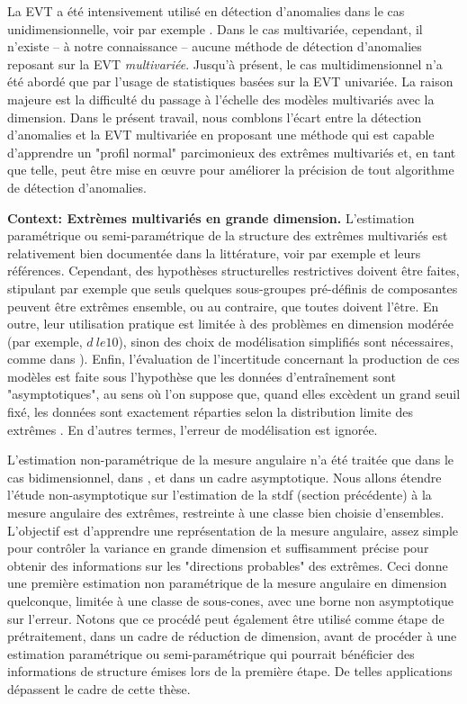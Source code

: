 La EVT a été intensivement utilisé en détection d'anomalies dans le cas unidimensionnelle, voir par exemple \cite{Roberts99, Roberts2000, Clifton2011, Clifton2008, Lee2008}. Dans le cas multivariée, cependant, il n'existe -- à notre connaissance -- aucune méthode de détection d'anomalies reposant sur la EVT \textit {multivariée}. Jusqu'à présent, le cas multidimensionnel n'a été abordé que par l'usage de statistiques basées sur la EVT univariée. La raison majeure est la difficulté du passage à l'échelle des modèles multivariés avec la dimension. Dans le présent travail, nous comblons l'écart entre la détection d'anomalies et la EVT multivariée en proposant une méthode qui est capable d'apprendre un "profil normal" parcimonieux des extrêmes multivariés et, en tant que telle, peut être mise en œuvre pour améliorer la précision de tout algorithme de détection d'anomalies.


\textbf{Context: Extrèmes multivariés en grande dimension.}
L'estimation paramétrique ou semi-paramétrique de la structure des extrêmes multivariés est relativement bien documentée dans la littérature, voir par exemple
\cite{coles1991modeling,fougeres2009models,cooley2010pairwise,sabourinNaveau2012} 
et leurs références. Cependant, des hypothèses structurelles restrictives doivent être faites, stipulant par exemple que seuls quelques sous-groupes pré-définis de composantes peuvent être extrêmes ensemble, ou au contraire, que toutes doivent l'être. En outre, leur utilisation pratique est limitée à des problèmes en dimension modérée (par exemple, $ d \ le 10 $), sinon des choix de modélisation simplifiés sont nécessaires, comme dans \cite {stephenson2009high}). Enfin, l'évaluation de l'incertitude concernant la production de ces modèles est faite sous l'hypothèse que les données d'entraînement sont "asymptotiques", au sens où l'on suppose que, quand elles excèdent un grand seuil fixé, les données sont exactement réparties selon la distribution limite des extrêmes . En d'autres termes, l'erreur de modélisation est ignorée.


L'estimation non-paramétrique de la mesure angulaire n'a été traitée que dans le cas bidimensionnel, dans \cite{Einmahl2001, Einmahl2009}, et dans un cadre asymptotique. Nous allons étendre l'étude non-asymptotique sur l'estimation de la {\sc stdf} (section précédente) à la mesure angulaire des extrêmes, restreinte à une classe bien choisie d'ensembles. L'objectif est d'apprendre une représentation de la mesure angulaire, assez simple pour contrôler la variance en grande dimension et suffisamment précise pour obtenir des informations sur les "directions probables" des extrêmes. Ceci donne une première estimation non paramétrique de la mesure angulaire en dimension quelconque, limitée à une classe de sous-cones, avec une borne non asymptotique sur l'erreur.
Notons que ce procédé peut également être utilisé comme étape de prétraitement, dans un cadre de réduction de  dimension, avant de procéder à une estimation paramétrique ou semi-paramétrique qui pourrait bénéficier des informations de structure émises lors de la première étape. De telles applications dépassent le cadre de cette thèse.

